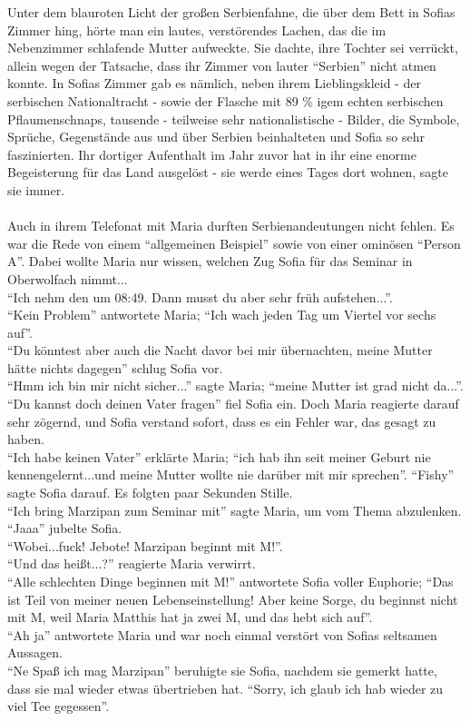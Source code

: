 \documentclass[oneside]{memoir}
\begin{document}
     Unter dem blauroten Licht der großen Serbienfahne, die über dem Bett in Sofias Zimmer hing, hörte man ein lautes, verstörendes Lachen, das die im Nebenzimmer schlafende Mutter aufweckte. Sie dachte, ihre Tochter sei verrückt, allein wegen der Tatsache, dass ihr Zimmer von lauter “Serbien” nicht atmen konnte. In Sofias Zimmer gab es nämlich, neben ihrem Lieblingskleid - der serbischen Nationaltracht - sowie der Flasche mit 89 \% igem echten serbischen Pflaumenschnaps, tausende - teilweise sehr nationalistische - Bilder, die Symbole, Sprüche, Gegenstände aus und über Serbien beinhalteten und Sofia so sehr faszinierten. Ihr dortiger Aufenthalt im Jahr zuvor hat in ihr eine enorme Begeisterung für das Land ausgelöst - sie werde eines Tages dort wohnen, sagte sie immer.  \\  \\ 

Auch in ihrem Telefonat mit Maria durften Serbienandeutungen nicht fehlen. Es war die Rede von einem “allgemeinen Beispiel” sowie von einer ominösen “Person A”. Dabei wollte Maria nur wissen, welchen Zug Sofia für das Seminar in Oberwolfach nimmt...  \\ 
“Ich nehm den um 08:49. Dann musst du aber sehr früh aufstehen...”.  \\ 
“Kein Problem” antwortete Maria; “Ich wach jeden Tag um Viertel vor sechs auf”. \\  
“Du könntest aber auch die Nacht davor bei mir übernachten, meine Mutter hätte nichts dagegen” schlug Sofia vor.  \\ 
“Hmm ich bin mir nicht sicher...” sagte Maria; “meine Mutter ist grad nicht da...”.  \\ 
“Du kannst doch deinen Vater fragen” fiel Sofia ein. 
Doch Maria reagierte darauf sehr zögernd, und Sofia verstand sofort, dass es ein Fehler war, das gesagt zu haben. \\ 
“Ich habe keinen Vater” erklärte Maria; “ich hab ihn seit meiner Geburt nie kennengelernt...und meine Mutter wollte nie darüber mit mir sprechen”. “Fishy” sagte Sofia darauf. 
Es folgten paar Sekunden Stille. 
 \\ 
“Ich bring Marzipan zum Seminar mit”  sagte Maria, um vom Thema abzulenken. 
“Jaaa” jubelte Sofia.  \\ 
“Wobei...fuck! Jebote! Marzipan beginnt mit M!”.  \\ 
“Und das heißt...?” reagierte Maria verwirrt.  \\ 
“Alle schlechten Dinge beginnen mit M!” antwortete Sofia voller Euphorie; “Das ist Teil von meiner neuen Lebenseinstellung! Aber keine Sorge, du beginnst nicht mit M, weil Maria Matthis hat ja zwei M, und das hebt sich auf”.  \\ 
“Ah ja” antwortete Maria und war noch einmal verstört von Sofias seltsamen Aussagen.  \\ 
“Ne Spaß ich mag Marzipan” beruhigte sie Sofia, nachdem sie gemerkt hatte, dass sie mal wieder etwas übertrieben hat.
“Sorry, ich glaub ich hab wieder zu viel Tee gegessen”.
\end{document}
